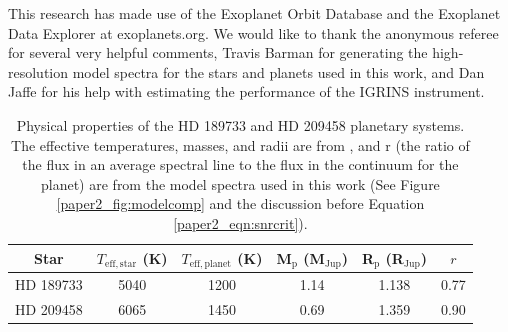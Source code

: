 This research has made use of the Exoplanet Orbit Database and the Exoplanet Data Explorer at exoplanets.org. We would like to thank the anonymous referee for several very helpful comments, Travis Barman for generating the high-resolution model spectra for the stars and planets used in this work, and Dan Jaffe for his help with estimating the performance of the IGRINS instrument.



\begin{table}
  \centering
    \caption{Physical properties of the HD 189733 and HD 209458 planetary systems. The effective temperatures, masses, and radii are from \cite{Torres2008}, and r (the ratio of the flux in an average spectral line to the flux in the continuum for the planet) are from the model spectra used in this work (See Figure \ref{paper2_fig:modelcomp} and the discussion before Equation \ref{paper2_eqn:snrcrit}).}
  \begin{tabular}{|c|ccccc|}
    \hline
    Star & $T_\mathrm{ eff, star}$ (K) & $T_\mathrm{ eff, planet}$ (K) & M$_\mathrm{ p}$ (M$_\mathrm{ Jup}$) & R$_\mathrm{ p}$ (R$_\mathrm{ Jup}$)  & $r$ \\ \hline
    HD 189733 & 5040 & 1200 & 1.14 & 1.138 & 0.77 \\
    HD 209458 & 6065 & 1450 & 0.69 & 1.359 & 0.90 \\ \hline
  \end{tabular}

  \label{paper2_tab:planet}
\end{table}





